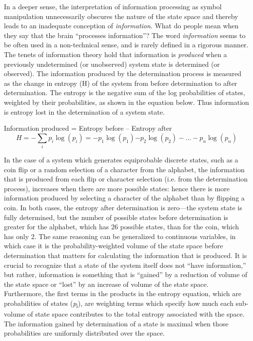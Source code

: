 In a deeper sense, the interpretation of information processing as symbol manipulation unnecessarily obscures the nature of the state space and thereby leads to an inadequate conception of \textit{information}. What do people mean when they say that the brain “processes information”? The word \textit{information} seems to be often used in a non-technical sense, and is rarely defined in a rigorous manner. The tenets of information theory \citep{Shannon1948} hold that information is \textit{produced} when a previously undetermined (or unobserved) system state is determined (or observed). The information produced by the determination process is measured as the change in entropy (H) of the system from before determination to after determination. The entropy is the negative sum of the log probabilities of states, weighted by their probabilities, as shown in the equation below. Thus information is entropy lost in the determination of a system state.

\ea
  Information produced = Entropy before – Entropy after
$$
H=-\sum _{i}{{p}_{i}\log \left({p}_{i}\right)={-p}_{1}\log \left({p}_{1}\right){-p}_{2}\log \left({p}_{2}\right)-{\dots}-{p}_{n}\log \text{⁡}\left({p}_{n}\right)}
$$
\z

In the case of a system which generates equiprobable discrete states, such as a coin flip or a random selection of a character from the alphabet, the information that is produced from each flip or character selection (i.e. from the determination process), increases when there are more possible states: hence there is more information produced by selecting a character of the alphabet than by flipping a coin. In both cases, the entropy after determination is zero—the system state is fully determined, but the number of possible states before determination is greater for the alphabet, which has 26 possible states, than for the coin, which has only 2. The same reasoning can be generalized to continuous variables, in which case it is the probability-weighted volume of the state space before determination that matters for calculating the information that is produced. It is crucial to recognize that a state of the system itself does not “have information,” but rather, information is something that is “gained” by a reduction of volume of the state space or “lost” by an increase of volume of the state space. Furthermore, the first terms in the products in the entropy equation, which are probabilities of states (\textit{p}\textsubscript{i}), are weighting terms which specify how much each sub-volume of state space contributes to the total entropy associated with the space. The information gained by determination of a state is maximal when those probabilities are uniformly distributed over the space.


